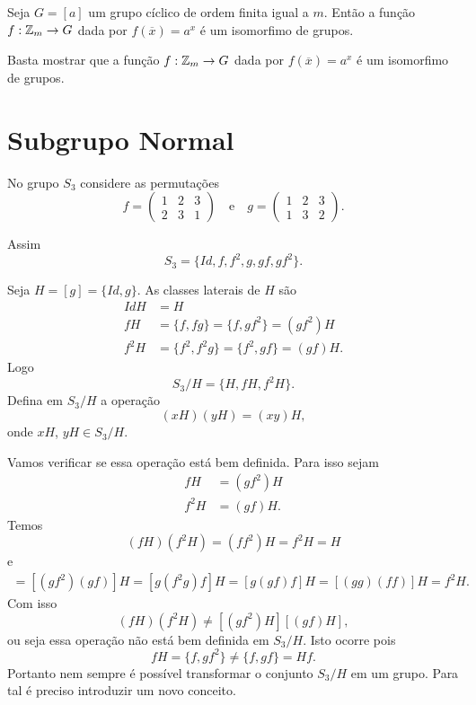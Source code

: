 \begin{corolario}
    Seja $G = [a]$ um grupo cíclico de ordem finita igual a $m$. Então a função $f : \mathbb{Z}_m \to G$ dada por $f(\overline{x}) = a^x$ é um isomorfimo de grupos.
\end{corolario}
\begin{prova}
    Basta mostrar que a função $f : \mathbb{Z}_m \to G$ dada por $f(\overline{x}) = a^x$ é um isomorfimo de grupos.
\end{prova}

\section{Subgrupo Normal} %
\label{sec:subgrupo_normal}

No grupo $S_3$ considere as permutações
\[
    f = \begin{pmatrix}
        1 & 2 & 3\\
        2 & 3 & 1
    \end{pmatrix} \quad \mbox{e}\quad
    g = \begin{pmatrix}
        1 & 2 & 3\\
        1 & 3 & 2
    \end{pmatrix}.
\]

Assim
\[
    S_3 = \{Id, f, f^2, g, gf, gf^2\}.
\]

Seja $H = [g] = \{Id, g\}$. As classes laterais de $H$ são
\begin{align*}
    IdH &= H\\
    fH &= \{f, fg\} = \{f, gf^2\} = (gf^2)H\\
    f^2H &= \{f^2, f^2g\} = \{f^2, gf\} = (gf)H.
\end{align*}
Logo
\[
    S_3/H = \{H, fH, f^2H\}.
\]
Defina em $S_3/H$ a operação
\[
    (xH)(yH) = (xy)H,
\]
onde $xH$, $yH \in S_3/H$.

Vamos verificar se essa operação está bem definida. Para isso sejam
\begin{align*}
    fH &= (gf^2)H\\
    f^2H &= (gf)H.
\end{align*}
Temos
\[
    (fH)(f^2H) = (ff^2)H = f^2H = H
\]
e
\begin{align*}
    [(gf^2)H][(gf)H] = [(gf^2)(gf)]H = [g(f^2g)f]H = [g(gf)f]H = [(gg)(ff)]H = f^2H.
\end{align*}
Com isso
\[
    (fH)(f^2H) \ne [(gf^2)H][(gf)H],
\]
ou seja essa operação não está bem definida em $S_3/H$. Isto ocorre pois
\[
    fH = \{f, gf^2\} \ne \{f, gf\} = Hf.
\]
Portanto nem sempre é possível transformar o conjunto $S_3/H$ em um grupo. Para tal é preciso introduzir um novo conceito.

